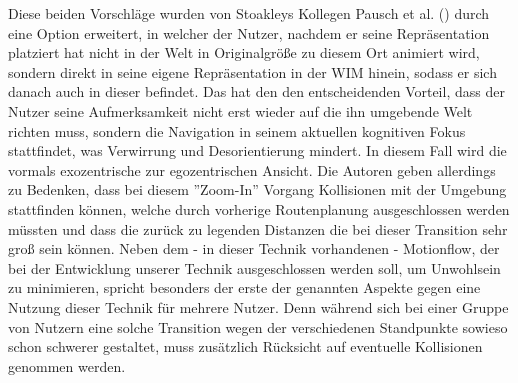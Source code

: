 Diese beiden Vorschläge wurden von Stoakleys Kollegen Pausch et al. (\cite{5_pausch_WIM}) durch eine Option erweitert, in welcher der Nutzer, nachdem er seine Repräsentation platziert hat nicht in der Welt in Originalgröße zu diesem Ort animiert wird, sondern direkt in seine eigene Repräsentation in der WIM hinein, sodass er sich danach auch in dieser befindet.
Das hat den den entscheidenden Vorteil, dass der Nutzer seine Aufmerksamkeit nicht erst wieder auf die ihn umgebende Welt richten muss, sondern die Navigation in seinem aktuellen kognitiven Fokus stattfindet, was Verwirrung und Desorientierung mindert. In diesem Fall wird die vormals exozentrische zur egozentrischen Ansicht.
Die Autoren geben allerdings zu Bedenken, dass bei diesem ”Zoom-In” Vorgang Kollisionen mit der Umgebung stattfinden können, welche durch vorherige Routenplanung ausgeschlossen werden müssten und dass die zurück zu legenden Distanzen die bei dieser Transition sehr groß sein können. 
Neben dem - in dieser Technik vorhandenen - Motionflow, der bei der Entwicklung unserer Technik ausgeschlossen werden soll, um Unwohlsein zu minimieren, spricht besonders der erste der genannten Aspekte gegen eine Nutzung dieser Technik für mehrere Nutzer. Denn während sich bei einer Gruppe von Nutzern eine solche Transition wegen der verschiedenen Standpunkte sowieso schon schwerer gestaltet, muss zusätzlich Rücksicht auf eventuelle Kollisionen genommen werden.

